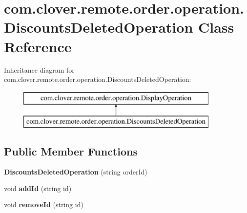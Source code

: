 \hypertarget{classcom_1_1clover_1_1remote_1_1order_1_1operation_1_1_discounts_deleted_operation}{}\section{com.\+clover.\+remote.\+order.\+operation.\+Discounts\+Deleted\+Operation Class Reference}
\label{classcom_1_1clover_1_1remote_1_1order_1_1operation_1_1_discounts_deleted_operation}
Inheritance diagram for com.\+clover.\+remote.\+order.\+operation.\+Discounts\+Deleted\+Operation\+:\begin{figure}[H]
\begin{center}
\leavevmode
\includegraphics[height=2.000000cm]{classcom_1_1clover_1_1remote_1_1order_1_1operation_1_1_discounts_deleted_operation}
\end{center}
\end{figure}
\subsection*{Public Member Functions}
\begin{DoxyCompactItemize}
\item 
\mbox{\label{classcom_1_1clover_1_1remote_1_1order_1_1operation_1_1_discounts_deleted_operation_abab94ca1f7408cc8fa41134280714ad5}} 
{\bfseries Discounts\+Deleted\+Operation} (string order\+Id)
\item 
\mbox{\label{classcom_1_1clover_1_1remote_1_1order_1_1operation_1_1_discounts_deleted_operation_a7529cca2b8d45d61d0e657ba1103cf13}} 
void {\bfseries add\+Id} (string id)
\item 
\mbox{\label{classcom_1_1clover_1_1remote_1_1order_1_1operation_1_1_discounts_deleted_operation_aa7354972209cd5258b5610471ba8fc26}} 
void {\bfseries remove\+Id} (string id)
\end{DoxyCompactItemize}
